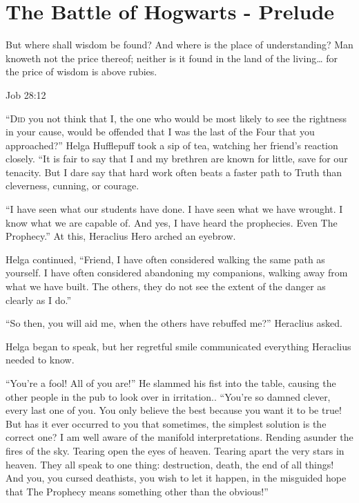 \chapter{The Battle of Hogwarts - Prelude}

But where shall wisdom be found? And where is the place of understanding? Man knoweth not the price thereof; neither is it found in the land of the living… for the price of wisdom is above rubies.

Job 28:12

\simpleline


\lettrine{“D}{id} you not think that I, the one who would be most likely to see the rightness in your cause, would be offended that I was the last of the Four that you approached?” Helga Hufflepuff took a sip of tea, watching her friend’s reaction closely. “It is fair to say that I and my brethren are known for little, save for our tenacity. But I dare say that hard work often beats a faster path to Truth than cleverness, cunning, or courage.

“I have seen what our students have done. I have seen what we have wrought. I know what we are capable of. And yes, I have heard the prophecies. Even The Prophecy.” At this, Heraclius Hero arched an eyebrow.

Helga continued, “Friend, I have often considered walking the same path as yourself. I have often considered abandoning my companions, walking away from what we have built. The others, they do not see the extent of the danger as clearly as I do.”

“So then, you will aid me, when the others have rebuffed me?” Heraclius asked.

Helga began to speak, but her regretful smile communicated everything Heraclius needed to know.

“You’re a fool! All of you are!” He slammed his fist into the table, causing the other people in the pub to look over in irritation.. “You’re so damned clever, every last one of you. You only believe the best because you want it to be true! But has it ever occurred to you that sometimes, the simplest solution is the correct one? I am well aware of the manifold interpretations. Rending asunder the fires of the sky. Tearing open the eyes of heaven. Tearing apart the very stars in heaven. They all speak to one thing: destruction, death, the end of all things! And you, you cursed deathists, you wish to let it happen, in the misguided hope that The Prophecy means something other than the obvious!”

